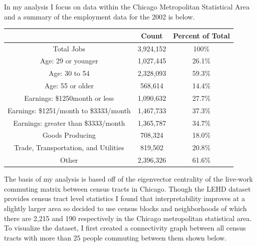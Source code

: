 \documentclass{article}
\theoremstyle{definition}
\theoremstyle{remark}
\begin{document}
In my analysis I focus on data within the Chicago Metropolitan Statistical Area and a summary of the employment data for the 2002 is below. \\
\begin{center}
 \begin{tabular}{|| c | c | c||} 
 \hline
 & Count & Percent of Total \\[0.5ex] 
 \hline\hline
 Total Jobs & 3,924,152  & 100\% \\  \hline
 Age: 29 or younger & 1,027,445 & 26.1\% \\ 
 Age: 30 to 54 & 2,328,093 & 59.3\% \\
 Age: 55 or older & 568,614 & 14.4\% \\ \hline
 Earnings: \$1250month or less & 1,090,632 & 27.7\% \\ 
 Earnings: \$1251/month to \$3333/month  & 1,467,733 & 37.3\% \\ 
 Earnings: greater than \$3333/month & 1,365,787 & 34.7\% \\ \hline
 Goods Producing  & 708,324 & 18.0\% \\ 
 Trade, Transportation, and Utilities  & 819,502 & 20.8\% \\ 
 Other  & 2,396,326 & 61.6\% \\ \hline 
\end{tabular}
\end{center}

The basis of my analysis is based off of the eigenvector centrality of the live-work commuting matrix between census tracts in Chicago.  Though the LEHD dataset provides census tract level statistics I found that interpretability improves at a slightly larger area so decided to use census blocks and neighborhoods of which there are 2,215 and 190 respectively in the Chicago metropolitan statistical area. To visualize the dataset, I first created a connectivity graph between all census tracts with more than 25 people commuting between them shown below.\\
\end{document}

